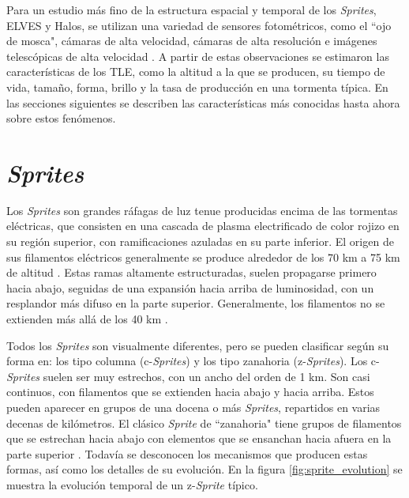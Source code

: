 \documentclass[11pt,oneside,openany,letter]{book}
\begin{document}
Para un estudio más fino de la estructura espacial y temporal de los \textit{Sprites}, ELVES y Halos, se utilizan una variedad de sensores fotométricos, como el ``ojo de mosca", cámaras de alta velocidad, cámaras de alta resolución e imágenes telescópicas de alta velocidad \cite{FullekrugEtal2006}. A partir de estas observaciones se estimaron las características de los TLE, como la altitud a la que se producen, su tiempo de vida, tamaño, forma, brillo y la tasa de producción en una tormenta típica. En las secciones siguientes se describen las características más conocidas hasta ahora sobre estos fenómenos. 

\section{\textit{Sprites}} 
Los \textit{Sprites} son grandes ráfagas de luz tenue producidas encima de las tormentas eléctricas, que consisten en una cascada de plasma electrificado de color rojizo en su región superior, con ramificaciones azuladas en su parte inferior. El origen de sus filamentos eléctricos generalmente se produce alrededor de los 70 km a 75 km de altitud \cite{FullekrugEtal2006}. Estas ramas altamente estructuradas, suelen propagarse primero hacia abajo, seguidas de una expansión hacia arriba de luminosidad, con un resplandor más difuso en la parte superior. Generalmente, los filamentos no se extienden más allá de los 40 km \cite{FullekrugEtal2006}. 

Todos los \textit{Sprites} son visualmente diferentes, pero se pueden clasificar según su forma en: los tipo columna (c-\textit{Sprites}) y los tipo zanahoria (z-\textit{Sprites}). Los c-\textit{Sprites} suelen ser muy estrechos, con un ancho del orden de 1 km. Son casi continuos, con filamentos que se extienden hacia abajo y hacia arriba. Estos pueden aparecer en grupos de una docena o más \textit{Sprites}, repartidos en varias decenas de kilómetros. El clásico \textit{Sprite} de ``zanahoria" tiene grupos de filamentos que se estrechan hacia abajo con elementos que se ensanchan hacia afuera en la parte superior \cite{FullekrugEtal2006}. Todavía se desconocen los mecanismos que producen estas formas, así como los detalles de su evolución. En la figura \ref{fig:sprite_evolution} se muestra la evolución temporal de un z-\textit{Sprite} típico.
\end{document}
